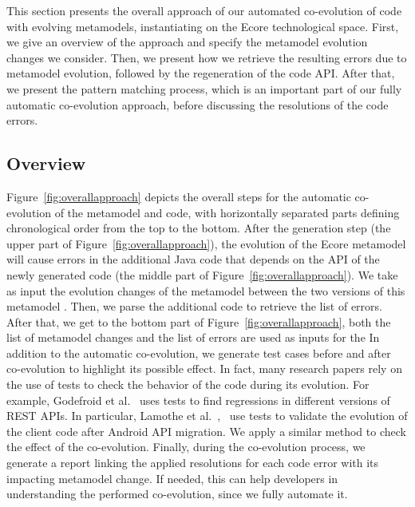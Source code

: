 This section presents the overall approach of our automated co-evolution of code with evolving metamodels,  instantiating on the Ecore technological space. First, we give an overview of the approach and specify the metamodel evolution changes we consider. 
%
Then, we present how we retrieve the resulting errors due to metamodel evolution, followed by the regeneration of the code API. 
After that, we present the pattern matching process, which is an important part of our fully automatic co-evolution approach, before discussing the resolutions of the code errors. 

\subsection{Overview}
\label{Overview}
Figure~\ref{fig:overallapproach} depicts the overall steps for the automatic co-evolution of the metamodel and code, with horizontally separated parts defining chronological order from the top to the bottom.
After the generation step (the upper part of Figure~\ref{fig:overallapproach}), the evolution of the Ecore metamodel will cause errors in the additional Java code that depends on the API of the newly generated code (the middle part of Figure~\ref{fig:overallapproach}). We take as input the evolution changes of the metamodel between the two versions of this metamodel {\small{}}. Then, we parse the additional code  {\small{}} to retrieve the list of errors. 
After that, we get to the bottom part of Figure~\ref{fig:overallapproach}, both the list of metamodel changes and the list of errors are used as inputs for the  
In addition to the automatic co-evolution, we generate test cases before and after co-evolution to highlight its possible effect. In fact, many research papers rely on the use of tests to check the behavior of the code during its evolution. For example, Godefroid et al.~\cite{10.1145/3395363.3397374} uses tests to find regressions in different versions of REST APIs. In particular, Lamothe et al.~\cite{9079197},~\cite{10.1145/3387905.3388608} use tests to validate the evolution of the client code after Android API migration. We apply a similar method to check the effect of the co-evolution. 
Finally, during the co-evolution process, we generate a report linking the applied resolutions for each code error with its impacting metamodel change. If needed, this can help developers in understanding the performed co-evolution, since we fully automate it.

